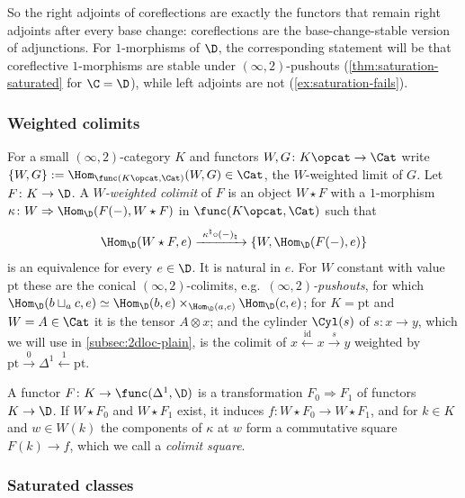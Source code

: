So the right adjoints of coreflections are exactly the functors that remain right adjoints after every base change: coreflections are the base-change-stable version of adjunctions. For $1$-morphisms of $\D$, the corresponding statement will be that coreflective $1$-morphisms are stable under $(\infty,2)$-pushouts (\cref{thm:saturation-saturated} for $\C = \D$), while left adjoints are not (\cref{ex:saturation-fails}).

\subsubsection*{Weighted colimits}
For a small $(\infty,2)$-category $K$ and functors $W, G\colon K\opcat \to \Cat$ write $\{W,G\} := \Hom_{\func(K\opcat,\Cat)}(W,G) \in \Cat$, the $W$-weighted limit of $G$.
Let $F\colon K \to \D$. A \emph{$W$-weighted colimit} of $F$ is an object $W \star F$ with a $1$-morphism $\kappa\colon W \Rightarrow \Hom_{\D}(F(-),W \star F)$ in $\func(K\opcat,\Cat)$ such that
\[
\Hom_{\D}(W \star F,e) \xrightarrow{\ \kappa^{\natural} \circ (-)_{\natural}\ } \{W,\Hom_{\D}(F(-),e)\}
\]
is an equivalence for every $e \in \D$. It is natural in $e$.
For $W$ constant with value $\mathrm{pt}$ these are the conical $(\infty,2)$-colimits, e.g.\ \emph{$(\infty,2)$-pushouts}, for which $\Hom_{\D}(b \sqcup_{a} c,e) \simeq \Hom_{\D}(b,e) \times_{\Hom_{\D}(a,e)} \Hom_{\D}(c,e)$; for $K = \mathrm{pt}$ and $W = A \in \Cat$ it is the tensor $A \otimes x$; and the cylinder $\Cyl(s)$ of $s\colon x \to y$, which we will use in \cref{subsec:2dloc-plain}, is the colimit of $x \xleftarrow{\mathrm{id}} x \xrightarrow{s} y$ weighted by $\mathrm{pt} \xrightarrow{0} \Delta^{1} \xleftarrow{1} \mathrm{pt}$.

A functor $F\colon K \to \func(\Delta^{1},\D)$ is a transformation $F_{0} \Rightarrow F_{1}$ of functors $K \to \D$. If $W \star F_{0}$ and $W \star F_{1}$ exist, it induces $f\colon W \star F_{0} \to W \star F_{1}$, and for $k \in K$ and $w \in W(k)$ the components of $\kappa$ at $w$ form a commutative square $F(k) \to f$, which we call a \emph{colimit square}.

\subsubsection*{Saturated classes}


